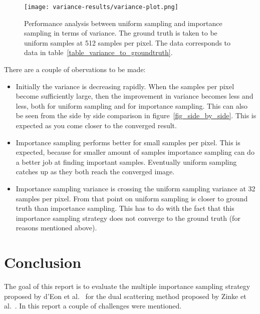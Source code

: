 \documentclass[11pt,a4paper]{report}
\begin{document}
\begin{figure}[h]
\begin{center}
\texttt{[image: variance-results/variance-plot.png]}
\end{center}
\caption{Performance analysis between uniform sampling and importance sampling in terms of variance. The ground truth is taken to be uniform samples at 512 samples per pixel. The data corresponds to data in table~\ref{table_variance_to_groundtruth}.}
\label{fig_variance_plot}
\end{figure}


There are a couple of obervations to be made:
\begin{itemize}

\item Initially the variance is decreasing rapidly. When the samples per pixel become sufficiently large, then the improvement in variance becomes less and less, both for uniform sampling and for importance sampling. This can also be seen from the side by side comparison in figure~\ref{fig_side_by_side}. This is expected as you come closer to the converged result.

\item Importance sampling performs better for small samples per pixel. This is expected, because for smaller amount of samples importance sampling can do a better job at finding important samples. Eventually uniform sampling catches up as they both reach the converged image.

\item Importance sampling variance is crossing the uniform sampling variance at 32 samples per pixel. From that point on uniform sampling is closer to ground truth than importance sampling. This has to do with the fact that this importance sampling strategy does not converge to the ground truth (for reasons mentioned above).


\end{itemize}


\chapter{Conclusion}

The goal of this report is to evaluate the multiple importance sampling strategy proposed by d'Eon et al.~\cite{eon2011} for the dual scattering method proposed by Zinke et al.~\cite{zinke}. In this report a couple of challenges were mentioned.
\end{document}
